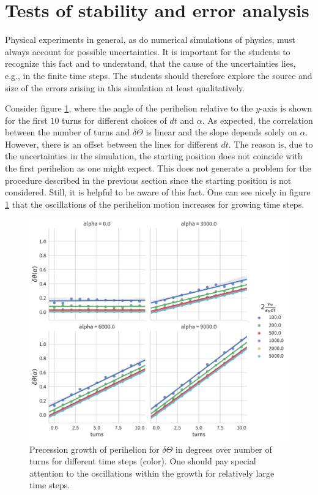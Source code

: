 \documentclass[12pt, UK english]{iopart}
\begin{document}
\section{Tests of stability and error analysis}\label{sec:stability}

Physical experiments in general, as do numerical simulations of physics, must always account for possible uncertainties.
It is important for the students to recognize this fact and to understand, that the cause of the uncertainties lies, e.g., in the finite time steps.
The students should therefore explore the source and size of the errors arising in this simulation at least qualitatively.

Consider figure \ref{fcc3}, where the angle of the perihelion relative to the $y$-axis is shown for the first $10$ turns for different choices of $dt$ and $\alpha$.
As expected, the correlation between the number of turns and $\delta\Theta$ is linear and the slope depends solely on $\alpha$.
However, there is an offset between the lines for different $dt$.
The reason is, due to the uncertainties in the simulation, the starting position does not coincide with the first perihelion as one might expect.
This does not generate a problem for the procedure described in the previous section since the starting position is not considered. Still, it is helpful to be aware of this fact.
One can see nicely in figure \ref{fcc3} that the oscillations of the perihelion motion increases for growing time steps. 

\begin{figure}[htb]
	\centering
	\includegraphics[width=.7\textwidth]{figs/precession_growth.pdf}
	\caption{\label{fcc3}Precession growth of perihelion for $\delta\Theta$ in degrees over number of turns for different time steps (color).  One should pay special attention to the oscillations within the growth for relatively large time steps.}
\end{figure}
\end{document}

